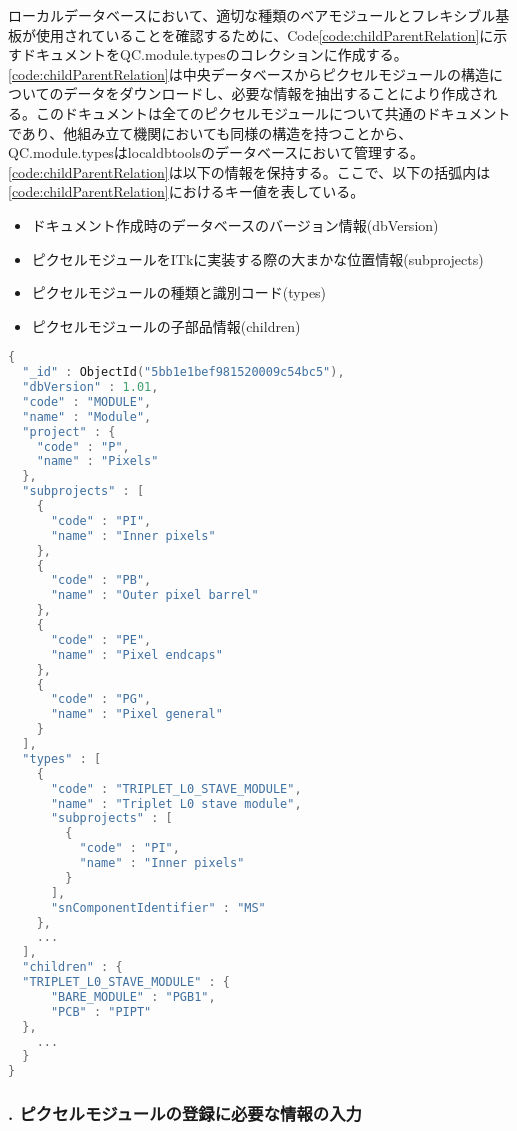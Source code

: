 ローカルデータベースにおいて、適切な種類のベアモジュールとフレキシブル基板が使用されていることを確認するために、Code\ref{code:childParentRelation}に示すドキュメントをQC.module.typesのコレクションに作成する。
\cref{code:childParentRelation}は中央データベースからピクセルモジュールの構造についてのデータをダウンロードし、必要な情報を抽出することにより作成される。このドキュメントは全てのピクセルモジュールについて共通のドキュメントであり、他組み立て機関においても同様の構造を持つことから、 QC.module.typesはlocaldbtoolsのデータベースにおいて管理する。\cref{code:childParentRelation}は以下の情報を保持する。ここで、以下の括弧内は\cref{code:childParentRelation}におけるキー値を表している。
\begin{itemize}
  \item ドキュメント作成時のデータベースのバージョン情報(dbVersion)
  \item ピクセルモジュールをITkに実装する際の大まかな位置情報(subprojects)
  \item ピクセルモジュールの種類と識別コード(types)
  \item ピクセルモジュールの子部品情報(children)
\end{itemize}

\begin{lstlisting}[caption=ピクセルモジュールの組み立て工程を管理するためのドキュメントの一部。,label=code:childParentRelation, language=C++]
{
  "_id" : ObjectId("5bb1e1bef981520009c54bc5"),
  "dbVersion" : 1.01,
  "code" : "MODULE",
  "name" : "Module",
  "project" : {
    "code" : "P",
    "name" : "Pixels"
  },
  "subprojects" : [
    {
      "code" : "PI",
      "name" : "Inner pixels"
    },
    {
      "code" : "PB",
      "name" : "Outer pixel barrel"
    },
    {
      "code" : "PE",
      "name" : "Pixel endcaps"
    },
    {
      "code" : "PG",
      "name" : "Pixel general"
    }
  ],
  "types" : [
    {
      "code" : "TRIPLET_L0_STAVE_MODULE",
      "name" : "Triplet L0 stave module",
      "subprojects" : [
        {
          "code" : "PI",
          "name" : "Inner pixels"
        }
      ],
      "snComponentIdentifier" : "MS"
    },
    ...
  ],
  "children" : {
  "TRIPLET_L0_STAVE_MODULE" : {
	  "BARE_MODULE" : "PGB1",
	  "PCB" : "PIPT"
  },
    ...
  }
}
\end{lstlisting}

\subsubsection{. ピクセルモジュールの登録に必要な情報の入力}

